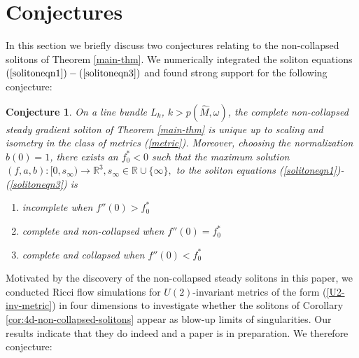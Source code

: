 \documentclass{amsart}
\newtheorem{thm}{Theorem}[section]
\newtheorem{conj}{Conjecture}
\theoremstyle{definition}
\theoremstyle{remark}
\numberwithin{equation}{section}
\newcommand{\R}{\mathbb{R}}  %
\begin{document}



\section{Conjectures}
In this section we briefly discuss two conjectures relating to the non-collapsed solitons of Theorem \ref{main-thm}. We numerically integrated the soliton equations $(\ref{solitoneqn1})-(\ref{solitoneqn3})$ and found strong support for the following conjecture:
\begin{conj}
On a line bundle $L_k$, $k > p ( \hat{M}, \omega)$, the complete non-collapsed steady gradient soliton of Theorem \ref{main-thm} is unique up to scaling and isometry in the class of metrics (\ref{metric}). Moreover, choosing the normalization $b(0)=1$, there exists an $f^{\ast}_0 < 0$ such that the maximum
solution $(f, a, b): [0, s_\infty) \rightarrow \R^3, s_\infty \in \R \cup \{ \infty\},$ to the soliton equations (\ref{solitoneqn1})-(\ref{solitoneqn3}) is
\begin{enumerate}
\item incomplete when $f''(0) > f^{\ast}_0$ 
\item complete and non-collapsed when $f''(0) = f^{\ast}_0$
\item complete and collapsed when $f''(0) < f^{\ast}_0$ 
\end{enumerate}
\end{conj}

Motivated by the discovery of the non-collapsed steady solitons in this paper, we conducted Ricci flow simulations for $U(2)$-invariant metrics of the form (\ref{U2-inv-metric}) in four dimensions to investigate whether the solitons of Corollary \ref{cor:4d-non-collapsed-solitons} appear as blow-up limits of singularities. Our results indicate that they do indeed and a paper is in preparation. We therefore conjecture:
\end{document}
